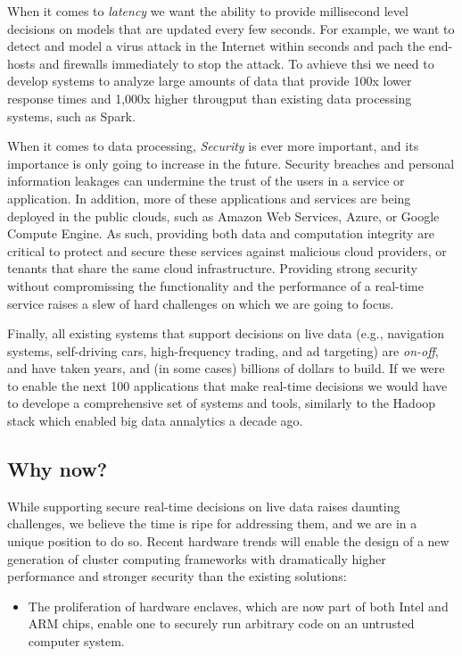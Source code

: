 \documentclass [10pt]{article}
\begin{document}
\begin{outline}
When it comes to {\em latency} we want the ability to provide millisecond level decisions on models that are updated every few seconds. For example, we want to detect and model a virus attack in the Internet within seconds and pach the end-hosts and firewalls immediately to stop the attack. To avhieve thsi we need to develop systems to analyze large amounts of data that provide 100x lower response times and 1,000x higher througput than existing data processing systems, such as Spark. 

When it comes to data processing, {\em Security} is ever more important, and its importance is only going to increase in the future. Security breaches and personal information leakages can undermine the trust of the users in a service or application. In addition, more of these applications and services are being deployed in the public clouds, such as Amazon Web Services, Azure, or Google Compute Engine. As such, providing both data and computation integrity are critical to protect and secure these services against malicious cloud providers, or tenants that share the same cloud infrastructure. Providing strong security without compromissing the functionality and the performance of a real-time service raises a slew of hard challenges on which we are going to focus.

Finally, all existing systems that support decisions on live data (e.g., navigation systems, self-driving cars, high-frequency trading, and ad targeting) are {\em on-off}, and have taken years, and (in some cases) billions of dollars to build. If we were to enable the next 100 applications that make real-time decisions we would have to develope a comprehensive set of systems and tools, similarly to the Hadoop stack which enabled big data annalytics a decade ago.


\subsection{Why now?}

While supporting secure real-time decisions on live data raises daunting challenges, we believe the time is ripe for addressing them, and we are in a unique position to do so. Recent hardware trends will enable the design of a new generation of cluster computing frameworks with dramatically higher performance and stronger security than the existing solutions: 

\begin{itemize}[noitemsep,topsep=0pt,parsep=0pt,partopsep=0pt]
\item The proliferation of hardware enclaves, which are now part of both Intel and ARM chips, enable one to securely run arbitrary code on an untrusted computer system.


\end{itemize}
\end{outline}
\end{document}
